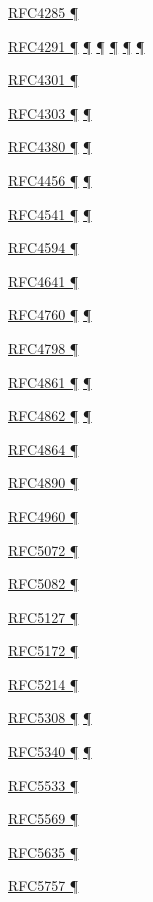 \documentclass[
]{article}
\begin{document}
\hyperref[obsolete-features-in-ipv6]{RFC4285 ¶}

\hyperref[why-ipv6-is-so-complicated]{RFC4291 ¶}
\hyperref[address-resolution]{¶} \hyperref[addresses]{¶}
\hyperref[filtering]{¶} \hyperref[obsolete-features-in-ipv6]{¶}
\hyperref[markdown-usage]{¶}

\hyperref[security]{RFC4301 ¶}

\hyperref[extension-headers-and-options]{RFC4303 ¶}
\hyperref[packet-format]{¶}

\hyperref[why-ipv6-is-so-complicated]{RFC4380 ¶}
\hyperref[obsolete-techniques]{¶}

\hyperref[routing]{RFC4456 ¶} \hyperref[routing-operation]{¶}

\hyperref[address-resolution]{RFC4541 ¶}
\hyperref[layer-2-considerations]{¶}

\hyperref[traffic-class-and-flow-label]{RFC4594 ¶}

\hyperref[filtering]{RFC4641 ¶}

\hyperref[routing]{RFC4760 ¶} \hyperref[routing-operation]{¶}

\hyperref[tunnels]{RFC4798 ¶}

\hyperref[address-resolution]{RFC4861 ¶}
\hyperref[auto-configuration]{¶}

\hyperref[auto-configuration]{RFC4862 ¶}
\hyperref[address-and-prefix-management]{¶}

\hyperref[topology-obfuscation]{RFC4864 ¶}

\hyperref[filtering]{RFC4890 ¶}

\hyperref[transport-protocols]{RFC4960 ¶}

\hyperref[layer-2-functions]{RFC5072 ¶}

\hyperref[filtering]{RFC5082 ¶}

\hyperref[traffic-class-and-flow-label]{RFC5127 ¶}

\hyperref[layer-2-functions]{RFC5172 ¶}

\hyperref[obsolete-techniques]{RFC5214 ¶}

\hyperref[routing]{RFC5308 ¶} \hyperref[routing-operation]{¶}

\hyperref[routing]{RFC5340 ¶} \hyperref[routing-operation]{¶}

\hyperref[multihoming]{RFC5533 ¶}

\hyperref[obsolete-techniques]{RFC5569 ¶}

\hyperref[filtering]{RFC5635 ¶}

\hyperref[address-resolution]{RFC5757 ¶}
\end{document}
